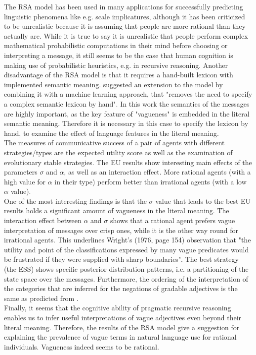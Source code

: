 The RSA model has been used in many applications for successfully predicting linguistic phenomena like e.g. scale implicatures, although it has been criticized to be unrealistic because it is assuming that people are more rational than they actually are. While it is true to say it is unrealistic that people perform complex mathematical probabilistic computations in their mind before choosing or interpreting a message, it still seems to be the case that human cognition is making use of probabilistic heuristics, e.g. in recursive reasoning. Another disadvantage of the RSA model is that it requires a hand-built lexicon with implemented semantic meaning. \cite{monroe2015learning} suggested an extension to the model by combining it with a machine learning approach, that "removes the need to specify a complex semantic lexicon by hand". In this work the semantics of the messages are highly important, as the key feature of "vagueness" is embedded in the literal semantic meaning. Therefore it is necessary in this case to specify the lexicon by hand, to examine the effect of language features in the literal meaning.\\

The measures of communicative success of a pair of agents with different strategies/types are the expected utility score as well as the examination of evolutionary stable strategies.
The EU results show interesting main effects of the parameters $\sigma$ and $\alpha$, as well as an interaction effect. More rational agents (with a high value for $\alpha$ in their type) perform better than irrational agents (with a low $\alpha$ value).\\

One of the most interesting findings is that the $\sigma$ value that leads to the best EU results holds a significant amount of vagueness in the literal meaning. The interaction effect between $\alpha$ and $\sigma$ shows that a rational agent prefers vague interpretation of messages over crisp ones, while it is the other way round for irrational agents.
This underlines Wright's (1976, page 154) observation that "the utility and point of the classifications expressed by many vague predicates would be frustrated if they were supplied with sharp boundaries". The best strategy (the ESS) shows specific posterior distribution patterns, i.e. a partitioning of the state space over the messages. Furthermore, the ordering of the interpretation of the categories that are inferred for the negations of gradable adjectives is the same as predicted from \cite{tesslernot}.\\

Finally, it seems that the cognitive ability of pragmatic recursive reasoning enables us to infer useful interpretations of vague adjectives even beyond their literal meaning. Therefore, the results of the RSA model give a suggestion for explaining the prevalence of vague terms in natural language use for rational individuals. Vagueness indeed seems to be rational.





